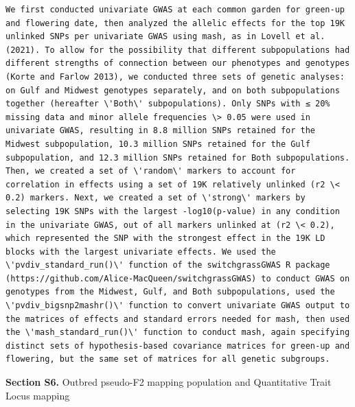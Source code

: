 \documentclass[
  letterpaper,
  DIV=11,
  numbers=noendperiod]{scrartcl}
\begin{document}
\begin{verbatim}
We first conducted univariate GWAS at each common garden for green-up and flowering date, then analyzed the allelic effects for the top 19K unlinked SNPs per univariate GWAS using mash, as in Lovell et al. (2021). To allow for the possibility that different subpopulations had different strengths of connection between our phenotypes and genotypes (Korte and Farlow 2013), we conducted three sets of genetic analyses: on Gulf and Midwest genotypes separately, and on both subpopulations together (hereafter \'Both\' subpopulations). Only SNPs with ≤ 20% missing data and minor allele frequencies \> 0.05 were used in univariate GWAS, resulting in 8.8 million SNPs retained for the Midwest subpopulation, 10.3 million SNPs retained for the Gulf subpopulation, and 12.3 million SNPs retained for Both subpopulations. Then, we created a set of \'random\' markers to account for correlation in effects using a set of 19K relatively unlinked (r2 \< 0.2) markers. Next, we created a set of \'strong\' markers by selecting 19K SNPs with the largest -log10(p-value) in any condition in the univariate GWAS, out of all markers unlinked at (r2 \< 0.2), which represented the SNP with the strongest effect in the 19K LD blocks with the largest univariate effects. We used the \'pvdiv_standard_run()\' function of the switchgrassGWAS R package (https://github.com/Alice-MacQueen/switchgrassGWAS) to conduct GWAS on genotypes from the Midwest, Gulf, and Both subpopulations, used the \'pvdiv_bigsnp2mashr()\' function to convert univariate GWAS output to the matrices of effects and standard errors needed for mash, then used the \'mash_standard_run()\' function to conduct mash, again specifying distinct sets of hypothesis-based covariance matrices for green-up and flowering, but the same set of matrices for all genetic subgroups. 
\end{verbatim}

\hfill\break

\textbf{Section S6.} Outbred pseudo-F2 mapping population and
Quantitative Trait Locus mapping
\end{document}
